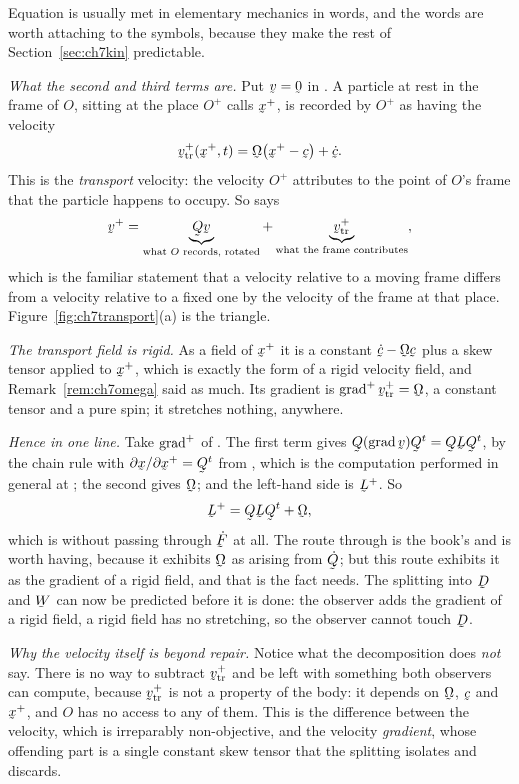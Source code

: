 \begin{remark}\label{rem:ch7transport}
Equation  is usually met in elementary mechanics in words, and
the words are worth attaching to the symbols, because they make the rest
of Section~\ref{sec:ch7kin} predictable.

\emph{What the second and third terms are.} Put $\bv=\bze$ in .
A particle at rest in the frame of $O$, sitting at the place $O^{+}$
calls $\bx^{+}$, is recorded by $O^{+}$ as having the velocity
\begin{equation*}
   \bv^{+}_{\text{tr}}(\bx^{+},t)=\bOm\big(\bx^{+}-\bc\big)+\dot\bc .
\end{equation*}
This is the \emph{transport} velocity: the velocity $O^{+}$ attributes to
the point of $O$'s frame that the particle happens to occupy. So
 says
\[
   \bv^{+}=\underbrace{\bQ\bv}_{\text{what }O\text{ records, rotated}}
   +\underbrace{\bv^{+}_{\text{tr}}}_{\text{what the frame contributes}},
\]
which is the familiar statement that a velocity relative to a moving
frame differs from a velocity relative to a fixed one by the velocity of
the frame at that place. Figure~\ref{fig:ch7transport}(a) is the
triangle.

\emph{The transport field is rigid.} As a field of $\bx^{+}$ it is a
constant $\dot\bc-\bOm\bc$ plus a skew tensor applied to $\bx^{+}$, which
is exactly the form  of a rigid velocity field, and
Remark~\ref{rem:ch7omega} said as much. Its gradient is
$\grad^{+}\bv^{+}_{\text{tr}}=\bOm$, a constant tensor and a pure spin;
it stretches nothing, anywhere.

\emph{Hence  in one line.} Take $\operatorname{grad}^{+}$ of . The
first term gives $\bQ(\grad\bv)\bQ^{t}=\bQ\bL\bQ^{t}$, by the chain rule
with $\partial\bx/\partial\bx^{+}=\bQ^{t}$ from , which is the
computation performed in general at ; the second gives $\bOm$;
and the left-hand side is $\bL^{+}$. So
\[
   \bL^{+}=\bQ\bL\bQ^{t}+\bOm ,
\]
which is  without passing through $\dot\bF$ at all. The route
through  is the book's and is worth having, because it exhibits
$\bOm$ as arising from $\dot\bQ$; but this route exhibits it as the
gradient of a rigid field, and that is the fact  needs. The
splitting into $\bD$ and $\bW$ can now be predicted before it is done:
the observer adds the gradient of a rigid field, a rigid field has no
stretching, so the observer cannot touch $\bD$.

\emph{Why the velocity itself is beyond repair.} Notice what the
decomposition does \emph{not} say. There is no way to subtract
$\bv^{+}_{\text{tr}}$ and be left with something both observers can
compute, because $\bv^{+}_{\text{tr}}$ is not a property of the body: it
depends on $\bOm$, $\bc$ and $\bx^{+}$, and $O$ has no access to any of
them. This is the difference between the velocity, which is irreparably
non-objective, and the velocity \emph{gradient}, whose offending part is
a single constant skew tensor that the splitting  isolates and
discards.
\end{remark}

